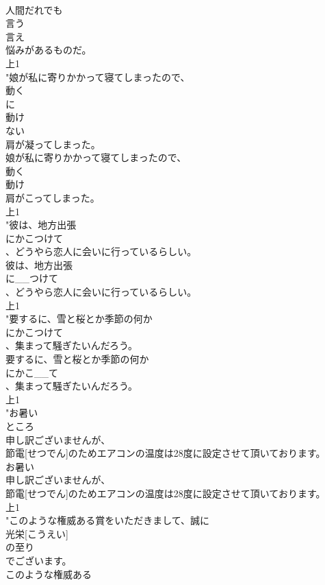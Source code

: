 \documentclass[8pt]{extreport}
\begin{document}
\begin{CJK}{UTF8}{min}
\\	人間だれでも
\\	言う
\\	言え
\\	悩みがあるものだ。
\\	上1
\\	"娘が私に寄りかかって寝てしまったので、
\\	動く
\\	に
\\	動け
\\	ない
\\	肩が凝ってしまった。
\\	娘が私に寄りかかって寝てしまったので、
\\	動く
\\	動け
\\	肩がこってしまった。
\\	上1
\\	"彼は、地方出張
\\	にかこつけて
\\	、どうやら恋人に会いに行っているらしい。
\\	彼は、地方出張
\\	に__つけて
\\	、どうやら恋人に会いに行っているらしい。
\\	上1
\\	"要するに、雪と桜とか季節の何か
\\	にかこつけて
\\	、集まって騒ぎたいんだろう。
\\	要するに、雪と桜とか季節の何か
\\	にかこ__て
\\	、集まって騒ぎたいんだろう。
\\	上1
\\	"お暑い
\\	ところ
\\	申し訳ございませんが、
\\	節電[せつでん]のためエアコンの温度は28度に設定させて頂いております。
\\	お暑い
\\	申し訳ございませんが、
\\	節電[せつでん]のためエアコンの温度は28度に設定させて頂いております。
\\	上1
\\	"このような権威ある賞をいただきまして、誠に
\\	光栄[こうえい]
\\	の至り
\\	でございます。
\\	このような権威ある

\end{CJK}
\end{document}
